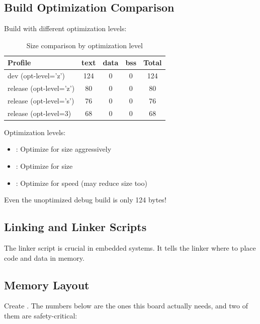 \subsection{Build Optimization Comparison}
\label{sec:optimization-comparsion}

Build with different optimization levels:

\begin{table}[H]
    \centering
    \begin{tabular}{l c c c c}
        \toprule
        \textbf{Profile} & \textbf{text} & \textbf{data} & \textbf{bss} & \textbf{Total} \\
        \midrule
        dev (opt-level='z') & 124 & 0 & 0 & 124 \\
        release (opt-level='z') & 80 & 0 & 0 & 80 \\
        release (opt-level='s') & 76 & 0 & 0 & 76 \\
        release (opt-level=3) & 68 & 0 & 0 & 68 \\
        \bottomrule
    \end{tabular}
    \caption{Size comparison by optimization level}
    \label{tab:optimization-size}
\end{table}

Optimization levels:
\begin{itemize}
    \item {}: Optimize for size aggressively
    \item {}: Optimize for size
    \item {}: Optimize for speed (may reduce size too)
\end{itemize}

Even the unoptimized debug build is only 124 bytes!

\subsection{Linking and Linker Scripts}
\label{sec:linking}

The linker script is crucial in embedded systems. It tells the linker where to place code and data in memory.
\subsection{Memory Layout}
Create . The numbers below are the ones this board actually needs,
and two of them are safety-critical:

